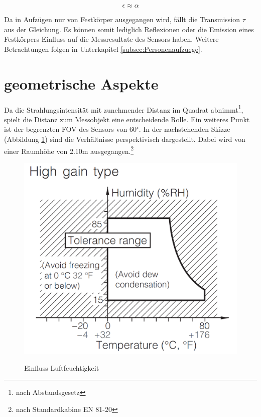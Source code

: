 \begin{equation}
\label{eq5}
\epsilon \approx  \alpha
\end{equation}

Da in Aufzügen nur von Festkörper ausgegangen wird, fällt die Transmission $\tau$ aus der Gleichung. Es können somit lediglich Reflexionen oder die Emission eines Festkörpers Einfluss auf die Messresultate des Sensors haben. Weitere Betrachtungen folgen in Unterkapitel \ref{subsec:Personenaufzuege}.

\section{geometrische Aspekte}
\label{sec:geometrie}

Da die Strahlungsintensität mit zunehmender Distanz im Quadrat abnimmt\footnote[4]{nach Abstandsgesetz}, spielt die Distanz zum Messobjekt eine entscheidende Rolle. Ein weiteres Punkt ist der begrenzten \ac{FOV} des Sensors von 60$^\circ$. In der nachstehenden Skizze (Abbildung \ref{fig:Geometrie}) sind die Verhältnisse perspektivisch dargestellt. Dabei wird von einer Raumhöhe von 2.10m ausgegangen.\footnote[5]{nach Standardkabine EN 81-20}  

\begin{figure}[H]
	\centering
	\includegraphics[width=1.0\textwidth]
	{fig/Humidity_Tolerance.PNG}
	\caption[Einfluss Luftfeuchtigkeit]{Einfluss Luftfeuchtigkeit} \protect\cite{AMG8834}
	\label{fig:Geometrie}
\end{figure}

